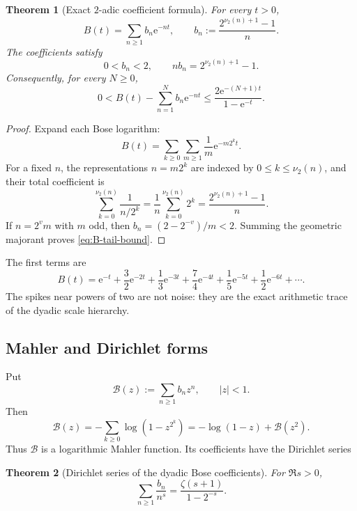 \documentclass[11pt,oneside]{article}
\numberwithin{equation}{section}
\newtheorem{theorem}{Theorem}[section]
\theoremstyle{definition}
\theoremstyle{remark}
\newcommand{\e}{\mathrm e}
\newcommand{\vTwo}{\nu_2}
\begin{document}
\begin{theorem}[Exact $2$-adic coefficient formula]
\label{thm:B-2adic}
For every $t>0$,
\begin{equation}
\boxed{
 B(t)=\sum_{n\ge1}b_n\e^{-nt},
 \qquad
 b_n:=\frac{2^{\vTwo(n)+1}-1}{n}.}
 \label{eq:B-2adic}
\end{equation}
The coefficients satisfy
\begin{equation}
 0<b_n<2,
 \qquad
 nb_n=2^{\vTwo(n)+1}-1.
 \label{eq:bn-bounds}
\end{equation}
Consequently, for every $N\ge0$,
\begin{equation}
 0<B(t)-\sum_{n=1}^Nb_n\e^{-nt}
 \le\frac{2\e^{-(N+1)t}}{1-\e^{-t}}.
 \label{eq:B-tail-bound}
\end{equation}
\end{theorem}

\begin{proof}
Expand each Bose logarithm:
\[
 B(t)=\sum_{k\ge0}\sum_{m\ge1}\frac1m\e^{-m2^kt}.
\]
For a fixed $n$, the representations $n=m2^k$ are indexed by
$0\le k\le\vTwo(n)$, and their total coefficient is
\[
 \sum_{k=0}^{\vTwo(n)}\frac1{n/2^k}
 =\frac1n\sum_{k=0}^{\vTwo(n)}2^k
 =\frac{2^{\vTwo(n)+1}-1}{n}.
\]
If $n=2^vm$ with $m$ odd, then
$b_n=(2-2^{-v})/m<2$.  Summing the geometric majorant proves
\eqref{eq:B-tail-bound}.
\end{proof}

The first terms are
\begin{equation}
 B(t)=\e^{-t}+\frac32\e^{-2t}+\frac13\e^{-3t}
 +\frac74\e^{-4t}+\frac15\e^{-5t}+\frac12\e^{-6t}
 +\cdots.
 \label{eq:B-first-terms}
\end{equation}
The spikes near powers of two are not noise: they are the exact arithmetic
trace of the dyadic scale hierarchy.

\subsection{Mahler and Dirichlet forms}

Put
\begin{equation}
 \mathcal B(z):=\sum_{n\ge1}b_nz^n,
 \qquad |z|<1.
 \label{eq:Bcal}
\end{equation}
Then
\begin{equation}
 \mathcal B(z)=-\sum_{k\ge0}\log(1-z^{2^k})
 =-\log(1-z)+\mathcal B(z^2).
 \label{eq:B-Mahler-z}
\end{equation}
Thus $\mathcal B$ is a logarithmic Mahler function.  Its coefficients have the
Dirichlet series
\begin{theorem}[Dirichlet series of the dyadic Bose coefficients]
\label{thm:bn-dirichlet}
For $\Re s>0$,
\begin{equation}
\boxed{
 \sum_{n\ge1}\frac{b_n}{n^s}
 =\frac{\zeta(s+1)}{1-2^{-s}}.}
 \label{eq:bn-dirichlet}
\end{equation}
\end{theorem}
\end{document}
